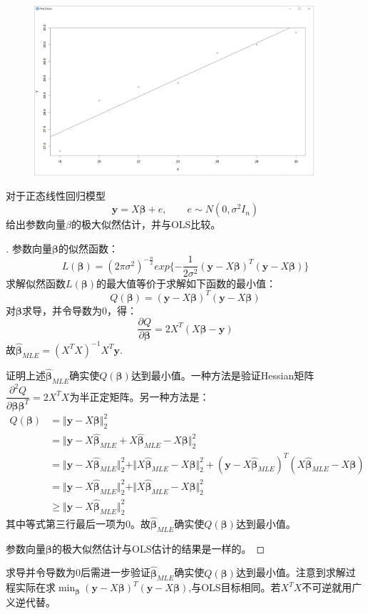 \documentclass[cn,hazy,green,12pt,normal]{elegantnote}
\newcommand{\p}{\partial}
\numberwithin{equation}{section}
\numberwithin{subsection}{section}
\begin{document}
\begin{figure}[!htbp]
    \centering
    \includegraphics[width=28em]{image/ex1_plt1.png}
\end{figure}
\begin{homework}
    对于正态线性回归模型
\[\bm y=X\bm \beta +e, \qquad e \sim N(0,\sigma^2 I_n)\]
给出参数向量$\beta$的极大似然估计，并与OLS比较。
\end{homework}
\begin{proof}[\solutionname]
    参数向量$\bm \beta$的似然函数：
    $$
    L(\bm \beta )=(2\pi \sigma^2)^{-\frac{n}{2}} exp\{-\frac{1}{2\sigma^2}(\bm y-X\bm \beta)^T(\bm y-X\bm \beta)\}
    $$
    求解似然函数$L(\bm \beta)$的最大值等价于求解如下函数的最小值：
    $$
    Q(\bm \beta) = (\bm y-X\bm \beta)^T(\bm y-X\bm \beta)
    $$
    对$\bm \beta$求导，并令导数为0，得：
    $$
    \dfrac{\p Q}{\p \bm \beta}=2X^T(X\bm \beta -\bm y)
    $$
    故$\hat{\bm \beta}_{MLE}=(X^TX)^{-1}X^T\bm y$.

    证明上述$\hat{\bm \beta}_{MLE}$确实使$Q(\bm \beta)$达到最小值。一种方法是验证Hessian矩阵$\dfrac{\p^2 Q}{\p \bm \beta \bm \beta^T}=2X^TX$为半正定矩阵。另一种方法是：
    $$
    \begin{aligned}
         Q(\bm \beta) &= \Vert \bm y-X\bm \beta \Vert_2^2 \\
         &= \Vert \bm y- X\hat{\bm \beta}_{MLE} + X\hat{\bm \beta}_{MLE} -X\bm \beta \Vert_2^2 \\
         &= \Vert \bm y- X\hat{\bm \beta}_{MLE} \Vert_2^2 + \Vert X\hat{\bm \beta}_{MLE} -X\bm \beta \Vert_2^2 + (\bm y- X\hat{\bm \beta}_{MLE})^T(X\hat{\bm \beta}_{MLE} -X\bm \beta) \\
         &= \Vert \bm y- X\hat{\bm \beta}_{MLE} \Vert_2^2 + \Vert X\hat{\bm \beta}_{MLE} -X\bm \beta \Vert_2^2 \\
         &\geq \Vert \bm y- X\hat{\bm \beta}_{MLE} \Vert_2^2
    \end{aligned}
    $$
    其中等式第三行最后一项为0。故$\hat{\bm \beta}_{MLE}$确实使$Q(\bm \beta)$达到最小值。

    参数向量$\bm \beta$的极大似然估计与OLS估计的结果是一样的。
\end{proof}
\begin{note}
    求导并令导数为0后需进一步验证$\hat{\bm \beta}_{MLE}$确实使$Q(\bm \beta)$达到最小值。注意到求解过程实际在求$\min_{\bm \beta} (\bm y-X\bm \beta)^T(\bm y-X\bm \beta)$,与OLS目标相同。若$X^TX$不可逆就用广义逆代替。
\end{note}
\end{document}
